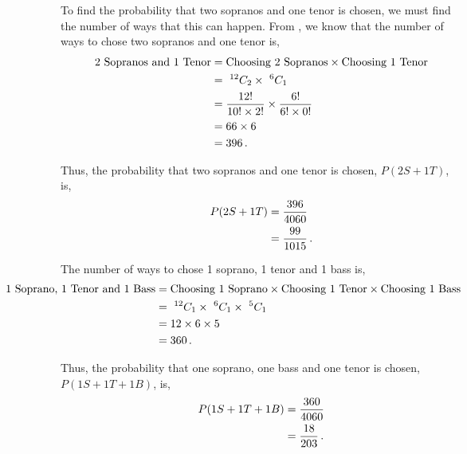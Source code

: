 \begin{subquestions}
\begin{subsubquestions}
\begin{subsubsubquestions}
To find the probability that two sopranos and one tenor is chosen, we must find the number of ways that this can happen. From , we know that the number of ways to chose two sopranos and one tenor is,
\begin{align}
	\text{2 Sopranos and 1 Tenor} & = \text{Choosing 2 Sopranos} \times \text{Choosing 1 Tenor} \nonumber \\
	                              & = ~ ^{12}C_2 \times  ~^{6}C_1 \nonumber \\
	                              & = \frac{12!}{10! \times 2!} \times \frac{6!}{6! \times 0!} \nonumber \\
	                              & = 66 \times 6 \nonumber \\
	                              & = 396 \,.
\end{align}

Thus, the probability that two sopranos and one tenor is chosen, $P(2S + 1T)$, is,
\begin{align}
	P(2S + 1T) & = \frac{396}{4060} \nonumber \\
	           & = \frac{99}{1015} \,.
\end{align}


\subsubsubquestion

The number of ways to chose 1 soprano, 1 tenor and 1 bass is,
\begin{align}
	\hspace{-50pt}
	\text{1 Soprano, 1 Tenor and 1 Bass} & =  \text{Choosing 1 Soprano} \times \text{Choosing 1 Tenor} \times \text{Choosing 1 Bass} \nn \\
	                                     & = ~^{12}C_1 \times ~^{6}C_1 \times ~^{5}C_1 \nn \\
	                                     & = 12 \times 6 \times 5 \nn \\
	                                     & = 360 \,.
\end{align}

Thus, the probability that one soprano, one bass and one tenor is chosen, $P(1S+1T+1B)$, is,
\begin{align}
	P(1S + 1T + 1B) & = \frac{360}{4060} \nonumber \\
			        & = \frac{18}{203} \,.
\end{align}



\end{subsubsubquestions}
\end{subsubquestions}
\end{subquestions}
